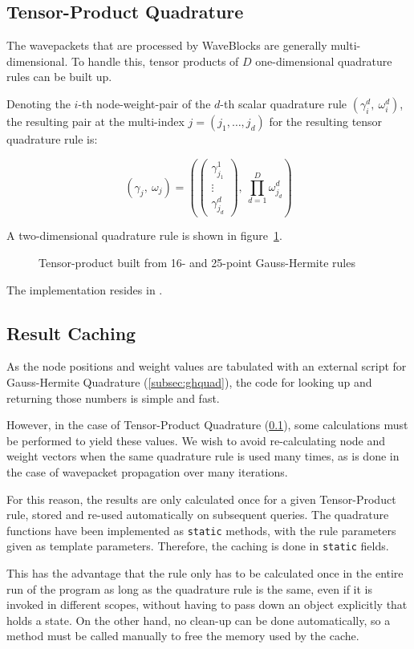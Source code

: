 \subsection{Tensor-Product Quadrature}
\label{subsec:tpquad}

The wavepackets that are processed by WaveBlocks are generally multi-dimensional.
To handle this, tensor products of $D$ one-dimensional quadrature rules can be
built up.

Denoting the $i$-th node-weight-pair of the $d$-th scalar quadrature rule
$(\gamma_i^d,\ \omega_i^d)$, the resulting pair at the multi-index $j = (j_1,
\ldots, j_d)$ for the resulting tensor quadrature rule is:

\begin{equation}
  (\gamma_j,\ \omega_j) = \left(
    \begin{pmatrix} \gamma_{j_1}^1 \\ \vdots \\ \gamma_{j_d}^d \end{pmatrix},
    \ \prod_{d=1}^D \omega_{j_d}^d
  \right)
\end{equation}

A two-dimensional quadrature rule is shown in figure~\ref{fig:tpexample}.

\begin{figure}
  \center
  
  \caption{Tensor-product built from 16- and 25-point Gauss-Hermite rules}
  \label{fig:tpexample}
\end{figure}

The implementation resides in .


\subsection{Result Caching}

As the node positions and weight values are tabulated with an external script
for Gauss-Hermite Quadrature (\ref{subsec:ghquad}), the code for looking up and
returning those numbers is simple and fast.

However, in the case of Tensor-Product Quadrature (\ref{subsec:tpquad}), some
calculations must be performed to yield these values.
We wish to avoid re-calculating node and weight vectors when the same quadrature
rule is used many times, as is done in the case of wavepacket propagation over
many iterations.

For this reason, the results are only calculated once for a given Tensor-Product
rule, stored and re-used automatically on subsequent queries.
The quadrature functions have been implemented as \texttt{static} methods, with
the rule parameters given as template parameters.
Therefore, the caching is done in \texttt{static} fields.

This has the advantage that the rule only has to be calculated once in the
entire run of the program as long as the quadrature rule is the same, even if it
is invoked in different scopes, without having to pass down an object explicitly
that holds a state.
On the other hand, no clean-up can be done automatically, so a method must be
called manually to free the memory used by the cache.
